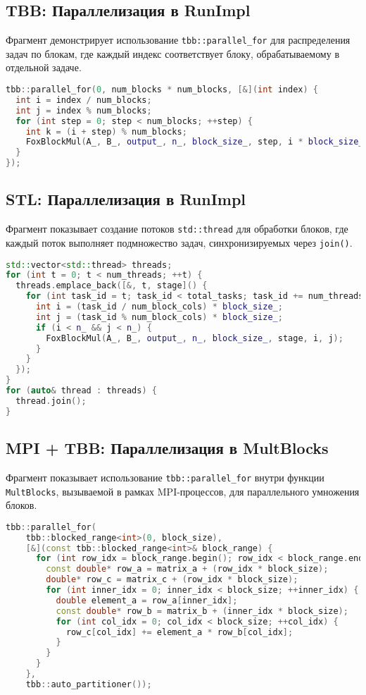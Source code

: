 \documentclass[12pt]{article}
\begin{document}
\subsection*{TBB: Параллелизация в RunImpl}

Фрагмент демонстрирует использование \texttt{tbb::parallel\_for} для распределения задач по блокам, где каждый индекс соответствует блоку, обрабатываемому в отдельной задаче.

\begin{lstlisting}[language=C++]
tbb::parallel_for(0, num_blocks * num_blocks, [&](int index) {
  int i = index / num_blocks;
  int j = index % num_blocks;
  for (int step = 0; step < num_blocks; ++step) {
    int k = (i + step) % num_blocks;
    FoxBlockMul(A_, B_, output_, n_, block_size_, step, i * block_size_, j * block_size_, k * block_size_);
  }
});
\end{lstlisting}

\subsection*{STL: Параллелизация в RunImpl}

Фрагмент показывает создание потоков \texttt{std::thread} для обработки блоков, где каждый поток выполняет подмножество задач, синхронизируемых через \texttt{join()}.

\begin{lstlisting}[language=C++]
std::vector<std::thread> threads;
for (int t = 0; t < num_threads; ++t) {
  threads.emplace_back([&, t, stage]() {
    for (int task_id = t; task_id < total_tasks; task_id += num_threads) {
      int i = (task_id / num_block_cols) * block_size_;
      int j = (task_id % num_block_cols) * block_size_;
      if (i < n_ && j < n_) {
        FoxBlockMul(A_, B_, output_, n_, block_size_, stage, i, j);
      }
    }
  });
}
for (auto& thread : threads) {
  thread.join();
}
\end{lstlisting}

\subsection*{MPI + TBB: Параллелизация в MultBlocks}

Фрагмент показывает использование \texttt{tbb::parallel\_for} внутри функции \texttt{MultBlocks}, вызываемой в рамках MPI-процессов, для параллельного умножения блоков.

\begin{lstlisting}[language=C++]
tbb::parallel_for(
    tbb::blocked_range<int>(0, block_size),
    [&](const tbb::blocked_range<int>& block_range) {
      for (int row_idx = block_range.begin(); row_idx < block_range.end(); ++row_idx) {
        const double* row_a = matrix_a + (row_idx * block_size);
        double* row_c = matrix_c + (row_idx * block_size);
        for (int inner_idx = 0; inner_idx < block_size; ++inner_idx) {
          double element_a = row_a[inner_idx];
          const double* row_b = matrix_b + (inner_idx * block_size);
          for (int col_idx = 0; col_idx < block_size; ++col_idx) {
            row_c[col_idx] += element_a * row_b[col_idx];
          }
        }
      }
    },
    tbb::auto_partitioner());
\end{lstlisting}
\end{document}
